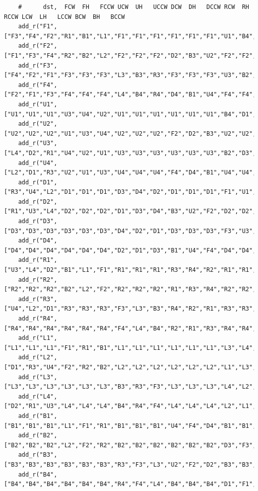 \begin{lstlisting}
    #      dst,  FCW  FH   FCCW UCW  UH   UCCW DCW  DH   DCCW RCW  RH   RCCW LCW  LH   LCCW BCW  BH   BCCW
    add_r("F1",["F3","F4","F2","R1","B1","L1","F1","F1","F1","F1","F1","F1","U1","B4","D1","F1","F1","F1"])
    add_r("F2",["F1","F3","F4","R2","B2","L2","F2","F2","F2","D2","B3","U2","F2","F2","F2","F2","F2","F2"])
    add_r("F3",["F4","F2","F1","F3","F3","F3","L3","B3","R3","F3","F3","F3","U3","B2","D3","F3","F3","F3"])
    add_r("F4",["F2","F1","F3","F4","F4","F4","L4","B4","R4","D4","B1","U4","F4","F4","F4","F4","F4","F4"])
    add_r("U1",["U1","U1","U1","U3","U4","U2","U1","U1","U1","U1","U1","U1","B4","D1","F1","R2","D4","L3"])
    add_r("U2",["U2","U2","U2","U1","U3","U4","U2","U2","U2","F2","D2","B3","U2","U2","U2","R4","D3","L1"])
    add_r("U3",["L4","D2","R1","U4","U2","U1","U3","U3","U3","U3","U3","U3","B2","D3","F3","U3","U3","U3"])
    add_r("U4",["L2","D1","R3","U2","U1","U3","U4","U4","U4","F4","D4","B1","U4","U4","U4","U4","U4","U4"])
    add_r("D1",["R3","U4","L2","D1","D1","D1","D3","D4","D2","D1","D1","D1","F1","U1","B4","D1","D1","D1"])
    add_r("D2",["R1","U3","L4","D2","D2","D2","D1","D3","D4","B3","U2","F2","D2","D2","D2","D2","D2","D2"])
    add_r("D3",["D3","D3","D3","D3","D3","D3","D4","D2","D1","D3","D3","D3","F3","U3","B2","L1","U2","R4"])
    add_r("D4",["D4","D4","D4","D4","D4","D4","D2","D1","D3","B1","U4","F4","D4","D4","D4","L3","U1","R2"])
    add_r("R1",["U3","L4","D2","B1","L1","F1","R1","R1","R1","R3","R4","R2","R1","R1","R1","R1","R1","R1"])
    add_r("R2",["R2","R2","R2","B2","L2","F2","R2","R2","R2","R1","R3","R4","R2","R2","R2","D4","L3","U1"])
    add_r("R3",["U4","L2","D1","R3","R3","R3","F3","L3","B3","R4","R2","R1","R3","R3","R3","R3","R3","R3"])
    add_r("R4",["R4","R4","R4","R4","R4","R4","F4","L4","B4","R2","R1","R3","R4","R4","R4","D3","L1","U2"])
    add_r("L1",["L1","L1","L1","F1","R1","B1","L1","L1","L1","L1","L1","L1","L3","L4","L2","U2","R4","D3"])
    add_r("L2",["D1","R3","U4","F2","R2","B2","L2","L2","L2","L2","L2","L2","L1","L3","L4","L2","L2","L2"])
    add_r("L3",["L3","L3","L3","L3","L3","L3","B3","R3","F3","L3","L3","L3","L4","L2","L1","U1","R2","D4"])
    add_r("L4",["D2","R1","U3","L4","L4","L4","B4","R4","F4","L4","L4","L4","L2","L1","L3","L4","L4","L4"])
    add_r("B1",["B1","B1","B1","L1","F1","R1","B1","B1","B1","U4","F4","D4","B1","B1","B1","B3","B4","B2"])
    add_r("B2",["B2","B2","B2","L2","F2","R2","B2","B2","B2","B2","B2","B2","D3","F3","U3","B1","B3","B4"])
    add_r("B3",["B3","B3","B3","B3","B3","B3","R3","F3","L3","U2","F2","D2","B3","B3","B3","B4","B2","B1"])
    add_r("B4",["B4","B4","B4","B4","B4","B4","R4","F4","L4","B4","B4","B4","D1","F1","U1","B2","B1","B3"])
\end{lstlisting}

